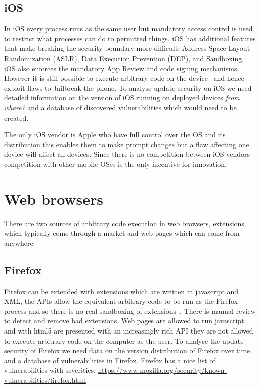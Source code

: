\documentclass[12pt,a4paper]{article}
\begin{document}
\subsection{iOS}
In iOS every process runs as the same user but mandatory access control is used to restrict what processes can do to permitted things.
iOS has additional features that make breaking the security boundary more difficult: Address Space Layout Randomization (ASLR), Data Execution Prevention (DEP), and Sandboxing, iOS also enforces the mandatory App Review and code signing mechanisms.
However it is still possible to execute arbitrary code on the device~\cite{Wang2013a} and hence exploit flaws to Jailbreak the phone.
To analyse update security on iOS we need detailed information on the version of iOS running on deployed devices \emph{from where?} and a database of discovered vulnerabilities which would need to be created.

The only iOS vendor is Apple who have full control over the OS and its distribution this enables them to make prompt changes but a flaw affecting one device will affect all devices.
Since there is no competition between iOS vendors competition with other mobile OSes is the only incentive for innovation.

\section{Web browsers}
There are two sources of arbitrary code execution in web browsers, extensions which typically come through a market and web pages which can come from anywhere.

\subsection{Firefox}
Firefox can be extended with extensions which are written in javascript and XML, the APIs allow the equivalent arbitrary code to be run as the Firefox process and so there is no real sandboxing of extensions~\cite{Lerner2013}.
There is manual review to detect and remove bad extensions.
Web pages are allowed to run javascript and with html5 are presented with an increasingly rich API they are not allowed to execute arbitrary code on the computer as the user.
To analyse the update security of Firefox we need data on the version distribution of Firefox over time and a database of vulnerabilities in Firefox.
Firefox has a nice list of vulnerabilities with severities: \url{https://www.mozilla.org/security/known-vulnerabilities/firefox.html}
\end{document}
